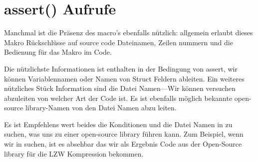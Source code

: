\section{assert() Aufrufe}

Manchmal ist die Präsenz des  macro's ebenfalls nützlich:
allgemein erlaubt dieses Makro Rückschlüsse auf source code Dateinamen,
Zeilen nummern und die Bedienung für das Makro im Code.

Die nützlichste Informationen ist enthalten in der Bedingung von assert, wir können Variablennamen oder Namen
von Struct Feldern ableiten. Ein weiteres nützliches Stück Information sind die Datei Namen---Wir können versuchen
abzuleiten von welcher Art der Code ist. 
Es ist ebenfalls möglich bekannte open-source library-Namen von den Datei Namen abzu leiten.



Es ist Empfehlens wert beides die Konditionen und die Datei Namen in  zu suchen, was uns zu einer open-source library führen kann. Zum Beispiel, wenn wir  in  suchen, ist es absehbar das wir als Ergebnis Code aus der 
Open-Source library für die LZW Kompression bekommen. %
